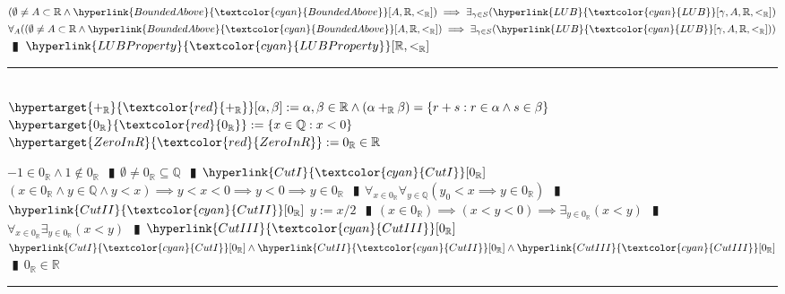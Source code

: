 \documentclass{book}
\newcommand{\df}[1]{\hypertarget{#1}{\textcolor{red}{#1}}}
\newcommand{\rf}[1]{\hyperlink{#1}{\textcolor{cyan}{#1}}}
\newcommand{\abr}{:=}
\newcommand{\pipe}{$\phantom{(}\vrectangleblack\phantom{)}$}
\begin{document}
\begin{enumerate}
\begin{enumerate}
  \end{enumerate}  
  \lit $(\emptyset \neq A \subset \mathbb{R} \land \rf{BoundedAbove}[A, \mathbb{R}, <_{\mathbb{R}}]) \implies \exists_{\gamma \in S}(\rf{LUB}[\gamma, A, \mathbb{R}, <_{\mathbb{R}}])$
  \lit $\forall_{A}((\emptyset \neq A \subset \mathbb{R} \land \rf{BoundedAbove}[A, \mathbb{R}, <_{\mathbb{R}}]) \implies \exists_{\gamma \in S}(\rf{LUB}[\gamma, A, \mathbb{R}, <_{\mathbb{R}}]))$ \pipe $\rf{LUBProperty}[\mathbb{R}, <_{\mathbb{R}}]$
\end{enumerate} \vspace{.75mm} \hrule \vspace{.75mm} \ \\

$\df{+_{\mathbb{R}}}[\alpha, \beta] \abr \alpha, \beta \in \mathbb{R} \land (\alpha +_{\mathbb{R}} \beta) = \{r + s : r \in \alpha \land s \in \beta\}$ \\
$\df{0_{\mathbb{R}}} \abr \{x \in \mathbb{Q} : x < 0\}$ \\

$\df{ZeroInR} \abr 0_{\mathbb{R}} \in \mathbb{R}$
\begin{enumerate}
  \lit $-1 \in 0_{\mathbb{R}} \land 1 \notin 0_{\mathbb{R}}$ \pipe $\emptyset \neq 0_{\mathbb{R}} \subseteq \mathbb{Q}$ \pipe $\rf{CutI}[0_{\mathbb{R}}]$
  \lit $(x \in 0_{\mathbb{R}} \land y \in \mathbb{Q} \land y < x) \implies y < x < 0 \implies y < 0 \implies y \in 0_{\mathbb{R}}$ \pipe $\forall_{x \in 0_{\mathbb{R}}} \forall_{y \in \mathbb{Q}} (y_0 < x \implies y \in 0_{\mathbb{R}})$ \pipe $\rf{CutII}[0_{\mathbb{R}}]$
  \lit $y \abr x / 2$ \pipe $(x \in 0_{\mathbb{R}}) \implies (x < y < 0) \implies \exists_{y \in 0_{\mathbb{R}}}(x < y)$ \pipe $\forall_{x \in 0_{\mathbb{R}}} \exists_{y \in 0_{\mathbb{R}}}(x < y)$ \pipe $\rf{CutIII}[0_{\mathbb{R}}]$
  \lit $\rf{CutI}[0_{\mathbb{R}}] \land \rf{CutII}[0_{\mathbb{R}}] \land \rf{CutIII}[0_{\mathbb{R}}]$ \pipe $0_{\mathbb{R}} \in \mathbb{R}$
\end{enumerate} \vspace{.75mm} \hrule \vspace{.75mm} \ \\
\end{document}
